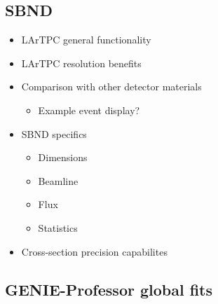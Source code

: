 \subsection{SBND}    

    \begin{itemize}

        \item LArTPC general functionality
        \item LArTPC resolution benefits
        \item Comparison with other detector materials
            \begin{itemize}
                \item Example event display?
            \end{itemize}
        \item SBND specifics

        \begin{itemize}

            \item Dimensions
            \item Beamline
            \item Flux
            \item Statistics

        \end{itemize}

        \item Cross-section precision capabilites

    \end{itemize}

\subsection{GENIE-Professor global fits}


\clearpage
